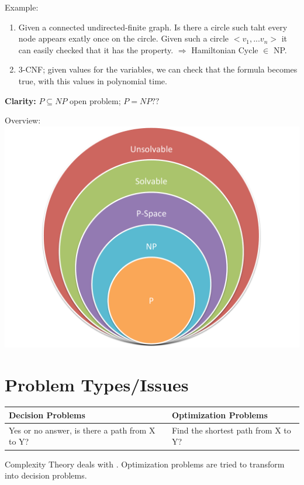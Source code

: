 \begin{example}
Example:
\begin{enumerate}
  \item Given a connected undirected-finite graph. Is there a circle such taht every node appears exatly once on the circle.
        Given such a circle $< v_{1},...v_{n}>$ it can easily checked that it has the property. $\Rightarrow$ Hamiltonian Cycle $\in$ 
        NP.
  \item 3-CNF; given values for the variables, we can check that the formula becomes true, with this values in polynomial time.
\end{enumerate}

\textbf{Clarity:} $P \subseteq NP$ open problem; $P = NP ??$

Overview: \\
\includegraphics[scale=0.3]{diagrams/comp_classes}
\end{example}

\section{Problem Types/Issues}

\begin{tabular}{p{5cm}|p{5cm}}
  \textbf{Decision Problems} & \textbf{Optimization Problems} \\
  \hline
  Yes or no answer, is there a path from X to Y? & Find the shortest path from X to Y?
\end{tabular}

\begin{definition}
  Complexity Theory deals with . Optimization problems are tried to transform into decision problems.
\end{definition}

